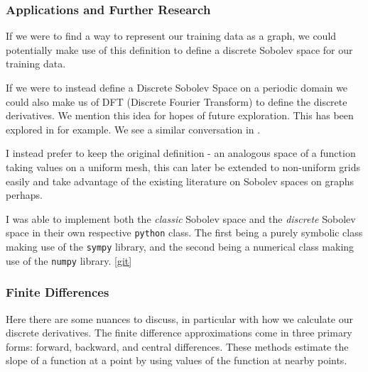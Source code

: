 \documentclass[11pt,a4paper]{article}
\theoremstyle{plain}
\theoremstyle{definition}
\theoremstyle{remark}
\begin{document}
\subsubsection{Applications and Further Research}
If we were to find a way to represent our training data as a graph, we could potentially make use of this definition to define a discrete Sobolev space for our training data.

If we were to instead define a Discrete Sobolev Space on a periodic domain we could also make us of DFT (Discrete Fourier Transform) to define the discrete derivatives. We mention this idea for hopes of future exploration. This has been explored in \cite{DFTSobolev} for example. We see a similar conversation in \cite{TaoSobolev}.

I instead prefer to keep the original definition - an analogous space of a function taking values on a uniform mesh, this can later be extended to non-uniform grids easily and take advantage of the existing literature on Sobolev spaces on graphs perhaps.

I was able to implement both the \textit{classic} Sobolev space and the \textit{discrete} Sobolev space in their own respective \verb|python| class. The first being a purely symbolic class making use of the \verb|sympy| library, and the second being a numerical class making use of the \verb|numpy| library. \ref*{git}

\subsubsection{Finite Differences}

Here there are some nuances to discuss, in particular with how we calculate our discrete derivatives. The finite difference approximations come in three primary forms: forward, backward, and central differences. These methods estimate the slope of a function at a point by using values of the function at nearby points.
\end{document}
